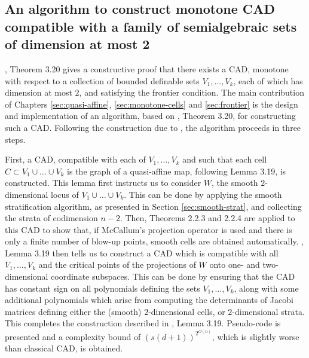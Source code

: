 \documentclass[
]{book}
\theoremstyle{definition}
\theoremstyle{definition}
\theoremstyle{definition}
\theoremstyle{definition}
\theoremstyle{remark}
\begin{document}
\hypertarget{an-algorithm-to-construct-monotone-cad-compatible-with-a-family-of-semialgebraic-sets-of-dimension-at-most-2}{%
\subsection{An algorithm to construct monotone CAD compatible with a family of semialgebraic sets of dimension at most 2}\label{an-algorithm-to-construct-monotone-cad-compatible-with-a-family-of-semialgebraic-sets-of-dimension-at-most-2}}

\citet{bgv15}, Theorem 3.20 gives a constructive proof that there exists a CAD, monotone with respect to a collection of bounded definable sets \(V_1,\ldots,V_k\), each of which has dimension at most \(2\), and satisfying the frontier condition. The main contribution of Chapters \ref{sec:quasi-affine}, \ref{sec:monotone-cells} and \ref{sec:frontier} is the design and implementation of an algorithm, based on \citet{bgv15}, Theorem 3.20, for constructing such a CAD. Following the construction due to \citet{bgv15}, the algorithm proceeds in three steps.

First, a CAD, compatible with each of \(V_1,\ldots,V_k\) and such that each cell \(C \subset V_1 \cup \ldots \cup V_k\) is the graph of a quasi-affine map, following \citet{bgv15} Lemma 3.19, is constructed. This lemma first instructs us to consider \(W\), the smooth \(2\)-dimensional locus of \(V_1 \cup \ldots \cup V_k\).
This can be done by applying the smooth stratification algorithm, as presented in Section \ref{sec:smooth-strat}, and collecting the strata of codimension \(n-2\). Then, \citet{mccallum1998} Theorems 2.2.3 and 2.2.4 are applied to this CAD to show that, if McCallum's projection operator is used and there is only a finite number of blow-up points, smooth cells are obtained automatically.
\citet{bgv15}, Lemma 3.19 then tells us to construct a CAD which is compatible with all \(V_1,\ldots,V_k\) and the critical points of the projections of \(W\) onto one- and two-dimensional coordinate subspaces. This can be done by ensuring that the CAD has constant sign on all polynomials defining the sets \(V_1,\ldots,V_k\), along with some additional polynomials which arise from computing the determinants of Jacobi matrices defining either the (smooth) \(2\)-dimensional cells, or \(2\)-dimensional strata.
This completes the construction described in \citet{bgv15}, Lemma 3.19. Pseudo-code is presented and a complexity bound of \(\left(s (d+1)\right)^{2^{O(n)}}\), which is slightly worse than classical CAD, is obtained.
\end{document}
